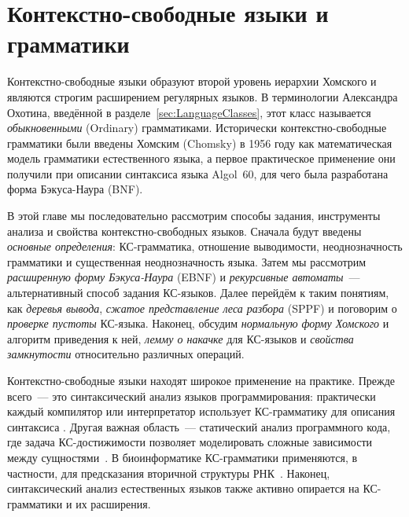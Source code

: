 \setchapterpreamble[u]{\margintoc}
\chapter{Контекстно-свободные языки и грамматики}
\label{chpt:CFG}

Контекстно-свободные языки образуют второй уровень иерархии Хомского и являются строгим расширением регулярных языков.
В терминологии Александра Охотина, введённой в разделе~\ref{sec:LanguageClasses}, этот класс называется \emph{обыкновенными} (Ordinary) грамматиками.
Исторически контекстно-свободные грамматики были введены Хомским (Chomsky) в 1956 году как математическая модель грамматики естественного языка, а первое практическое применение они получили при описании синтаксиса языка Algol~60, для чего была разработана форма Бэкуса-Наура (BNF).

В этой главе мы последовательно рассмотрим способы задания, инструменты анализа и свойства контекстно-свободных языков.
Сначала будут введены \emph{основные определения}: КС-грамматика, отношение выводимости, неоднозначность грамматики и существенная неоднозначность языка.
Затем мы рассмотрим \emph{расширенную форму Бэкуса-Наура} (EBNF) и \emph{рекурсивные автоматы}~--- альтернативный способ задания КС-языков.
Далее перейдём к таким понятиям, как \emph{деревья вывода}, \emph{сжатое представление леса разбора} (SPPF) и поговорим о \emph{проверке пустоты} КС-языка.
Наконец, обсудим \emph{нормальную форму Хомского} и алгоритм приведения к ней, \emph{лемму о накачке} для КС-языков и \emph{свойства замкнутости} относительно различных операций.

Контекстно-свободные языки находят широкое применение на практике.
Прежде всего~--- это синтаксический анализ языков программирования: практически каждый компилятор или интерпретатор использует КС-грамматику для описания синтаксиса%
%
.
Другая важная область~--- статический анализ программного кода, где задача КС-достижимости позволяет моделировать сложные зависимости между сущностями~\cite{Reps}.
В биоинформатике КС-грамматики применяются, в частности, для предсказания вторичной структуры РНК~\cite{Durbin_Eddy_Krogh_Mitchison_1998}.
Наконец, синтаксический анализ естественных языков также активно опирается на КС-грамматики и их расширения.

